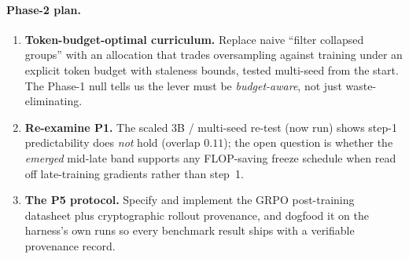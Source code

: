 \documentclass[12pt,a4paper]{report}
\begin{document}
\paragraph{Phase-2 plan.}
\begin{enumerate}[leftmargin=1.4em,itemsep=2pt]
  \item \textbf{Token-budget-optimal curriculum.} Replace naive ``filter collapsed
  groups'' with an allocation that trades oversampling against training under an
  explicit token budget with staleness bounds, tested multi-seed from the start.
  The Phase-1 null tells us the lever must be \emph{budget-aware}, not just
  waste-eliminating.
  \item \textbf{Re-examine P1.} The scaled 3B / multi-seed re-test (now run) shows
  step-1 predictability does \emph{not} hold (overlap $0.11$); the open question is whether
  the \emph{emerged} mid-late band supports any FLOP-saving freeze schedule when read off
  late-training gradients rather than step~1.
  \item \textbf{The P5 protocol.} Specify and implement the GRPO post-training
  datasheet plus cryptographic rollout provenance, and dogfood it on the harness's
  own runs so every benchmark result ships with a verifiable provenance record.
\end{enumerate}
\end{document}
